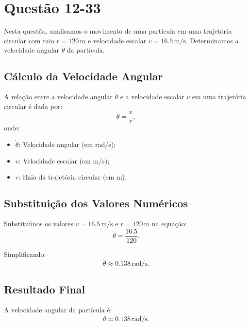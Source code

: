 \section{Questão 12-33}

Nesta questão, analisamos o movimento de uma partícula em uma trajetória circular com raio \(r = 120 \, \text{m}\) e velocidade escalar \(v = 16.5 \, \text{m/s}\). Determinamos a velocidade angular \(\dot{\theta}\) da partícula.

\subsection*{Cálculo da Velocidade Angular}
A relação entre a velocidade angular \(\dot{\theta}\) e a velocidade escalar \(v\) em uma trajetória circular é dada por:
\[
\dot{\theta} = \frac{v}{r},
\]
onde:
\begin{itemize}
    \item \(\dot{\theta}\): Velocidade angular (em rad/s);
    \item \(v\): Velocidade escalar (em m/s);
    \item \(r\): Raio da trajetória circular (em m).
\end{itemize}

\subsection*{Substituição dos Valores Numéricos}
Substituímos os valores \(v = 16.5 \, \text{m/s}\) e \(r = 120 \, \text{m}\) na equação:
\[
\dot{\theta} = \frac{16.5}{120}.
\]

Simplificando:
\[
\dot{\theta} \approx 0.138 \, \text{rad/s}.
\]

\subsection*{Resultado Final}
A velocidade angular da partícula é:
\[
\dot{\theta} \approx 0.138 \, \text{rad/s}.
\]
